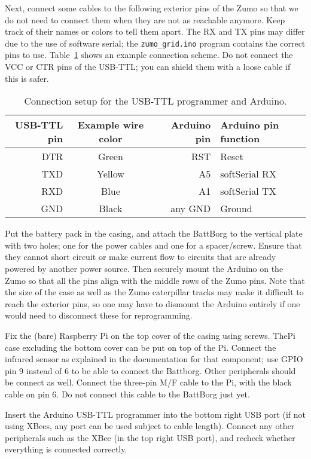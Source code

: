 \documentclass{article}
\begin{document}
Next, connect some cables to the following exterior pins of the Zumo so that 
we do not need to connect them when they are not as reachable anymore. Keep 
track of their names or colors to tell them apart. The RX and TX pins may 
differ due to the use of software serial; the {\tt zumo\_grid.ino} program 
contains the correct pins to use. Table~\ref{tab:serial} shows an example 
connection scheme. Do not connect the VCC or CTR pins of the USB-TTL; you can 
shield them with a loose cable if this is safer.

\begin{table}[h!]
  \centering
  \begin{tabular}{rcrl}
    \toprule
    USB-TTL pin & Example wire color & Arduino pin & Arduino pin function \\
    \midrule
    DTR & Green & RST & Reset \\
    TXD & Yellow & A5 & softSerial RX \\
    RXD & Blue & A1 & softSerial TX \\
    GND & Black & any GND & Ground \\
    \bottomrule
  \end{tabular}
  \caption{Connection setup for the USB-TTL programmer and Arduino.}
  \label{tab:serial}
\end{table}

Put the battery pack in the casing, and attach the BattBorg to the vertical 
plate with two holes; one for the power cables and one for a spacer/screw. 
Ensure that they cannot short circuit or make current flow to circuits that are 
already powered by another power source. Then securely mount the Arduino on the 
Zumo so that all the pins align with the middle rows of the Zumo pins. Note 
that the size of the case as well as the Zumo caterpillar tracks may make it 
difficult to reach the exterior pins, so one may have to dismount the Arduino 
entirely if one would need to disconnect these for reprogramming.

Fix the (bare) Raspberry Pi on the top cover of the casing using screws. ThePi 
case excluding the bottom cover can be put on top of the Pi. Connect the 
infrared sensor as explained in the documentation for that component; use GPIO 
pin 9 instead of 6 to be able to connect the Battborg. Other peripherals should 
be connect as well. Connect the three-pin M/F cable to the Pi, with the black 
cable on pin 6. Do not connect this cable to the BattBorg just yet.

Insert the Arduino USB-TTL programmer into the bottom right USB port (if not 
using XBees, any port can be used subject to cable length). Connect any other 
peripherals such as the XBee (in the top right USB port), and recheck whether 
everything is connected correctly.
\end{document}
